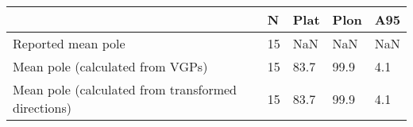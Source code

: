 \begin{tabular}{lllll}
\toprule
{} &   N &  Plat &  Plon &  A95 \\
\midrule
Reported mean pole                                 &  15 &   NaN &   NaN &  NaN \\
Mean pole (calculated from VGPs)                   &  15 &  83.7 &  99.9 &  4.1 \\
Mean pole (calculated from transformed directions) &  15 &  83.7 &  99.9 &  4.1 \\
\bottomrule
\end{tabular}
